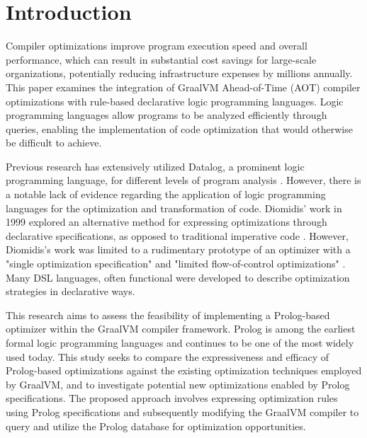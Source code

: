 \chapter[Introduction]{Introduction}

Compiler optimizations improve program execution speed and overall performance, which can result in substantial cost savings for large-scale organizations, potentially reducing infrastructure expenses by millions annually. This paper examines the integration of GraalVM Ahead-of-Time (AOT) compiler optimizations with rule-based declarative logic programming languages. Logic programming languages allow programs to be analyzed efficiently through queries, enabling the implementation of code optimization that would otherwise be difficult to achieve.

Previous research has extensively utilized Datalog, a prominent logic programming language, for different levels of program analysis \cite{Bravenboer2009,Tonder2021,Lam2005,Benton2007}. However, there is a notable lack of evidence regarding the application of logic programming languages for the optimization and transformation of code. Diomidis’ work in 1999 explored an alternative method for expressing optimizations through declarative specifications, as opposed to traditional imperative code \cite{Spinellis1999}. However, Diomidis's work was limited to a rudimentary prototype of an optimizer with a "single optimization specification" and "limited flow-of-control optimizations" \cite{Spinellis1999}. Many DSL languages, often functional \cite{Hagedorn2020,Jonathan2018} were developed to describe optimization strategies in declarative ways. 

This research aims to assess the feasibility of implementing a Prolog-based optimizer within the GraalVM compiler framework. Prolog is among the earliest formal logic programming languages and continues to be one of the most widely used today. This study seeks to compare the expressiveness and efficacy of Prolog-based optimizations against the existing optimization techniques employed by GraalVM, and to investigate potential new optimizations enabled by Prolog specifications. The proposed approach involves expressing optimization rules using Prolog specifications and subsequently modifying the GraalVM compiler to query and utilize the Prolog database for optimization opportunities.
